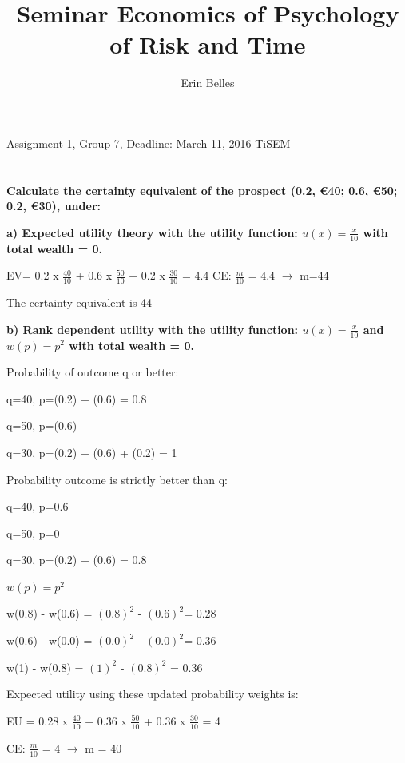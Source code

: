 \documentclass{article}
\title{Seminar Economics of Psychology of Risk and Time}
\author{Erin Belles}
\begin{document}
\maketitle 
 Assignment 1, Group 7, Deadline: March 11, 2016 TiSEM 

\section{}
\textbf{ Calculate the certainty equivalent of the prospect (0.2, €40; 0.6, €50; 0.2, €30), under: } 

\vspace{4mm}

\textbf{ a) Expected utility theory with the utility function: 
$u(x) = \frac{x}{10}$ 
	with total wealth = 0.} 

	\vspace{2mm}
		EV=	0.2	x $\frac{40}{10}$ +	0.6	x $\frac{50}{10}$ + 0.2 x $\frac{30}{10}$ =	4.4
	CE:	$\frac{m}{10}$ = 4.4 $\rightarrow$ m=44 
	
	The	certainty equivalent is	44
	\vspace{4mm}
	
	\textbf{ b) Rank dependent utility with the utility function:
$u(x) = \frac{x}{10}$ and $w(p) = p^{2}$
	 with total wealth = 0.}   

\vspace{2mm}
Probability	of	outcome	q	or	better:

q=40,	p=(0.2)	 +	(0.6)	=	0.8

q=50,	p=(0.6)

q=30,	p=(0.2)	 +	(0.6)	+ (0.2)	=	1

\vspace {2mm}

Probability	outcome	is	strictly	better	than q:


q=40,	p=0.6

q=50,	p=0

q=30,	p=(0.2)	+	(0.6)	=	0.8

$w(p)=p^2$

w(0.8)	-	 w(0.6)	=	$(0.8)^2$ - $(0.6)^2$=	0.28

w(0.6)	-	 w(0.0)	=	$(0.0)^2$ - $(0.0)^2$=	0.36

w(1)	-	 w(0.8)	=	$(1)^2$ - $(0.8)^2$ =	0.36

\vspace {2mm}

Expected	utility	using	these	updated	probability	weights	is:

EU	=	0.28	x	$\frac{40}{10}$	 +	0.36 x	$\frac{50}{10}$	+	0.36 x $\frac{30}{10}$	=	4

CE:	$\frac{m}{10}$	=	4 $\rightarrow$ m	=	40
\end{document}
